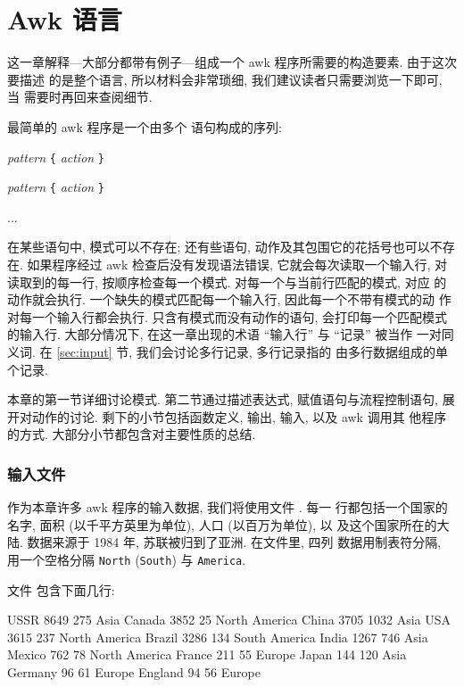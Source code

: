 
\chapter{Awk 语言}
\label{chap:the_awk_language}

这一章解释---大部分都带有例子---组成一个 awk 程序所需要的构造要素.
由于这次要描述
的是整个语言, 所以材料会非常琐细, 我们建议读者只需要浏览一下即可, 当
需要时再回来查阅细节.

最简单的 awk 程序是一个由多个 \patact 语句构成的序列:
\begin{pattern}
\textit{pattern} \texttt{\{} \textit{action} \texttt{\}} \par
\textit{pattern} \texttt{\{} \textit{action} \texttt{\}} \par
...
\end{pattern}
在某些语句中, 模式可以不存在; 还有些语句, 动作及其包围它的花括号也可以不存
在. 如果程序经过 awk 检查后没有发现语法错误, 它就会每次读取一个输入行,
对读取到的每一行, 按顺序检查每一个模式. 对每一个与当前行匹配的模式, 对应
的动作就会执行. 一个缺失的模式匹配每一个输入行, 因此每一个不带有模式的动
作对每一个输入行都会执行. 只含有模式而没有动作的语句, 会打印每一个匹配模式
的输入行. 大部分情况下, 在这一章出现的术语 ``输入行'' 与 ``记录'' 被当作
一对同义词. 在 \ref{sec:input} 节, 我们会讨论多行记录, 多行记录指的
由多行数据组成的单个记录.

本章的第一节详细讨论模式. 第二节通过描述表达式, 赋值语句与流程控制语句,
展开对动作的讨论. 剩下的小节包括函数定义, 输出, 输入, 以及 awk 调用其
他程序的方式. 大部分小节都包含对主要性质的总结.

\subsection*{输入文件}
\label{subsec:the_input_file_countries}

作为本章许多 awk 程序的输入数据, 我们将使用文件 . 每一
行都包括一个国家的名字, 面积 (以千平方英里为单位), 人口 (以百万为单位), 以
及这个国家所在的大陆. 数据来源于 1984 年, 苏联被归到了亚洲. 在文件里, 四列
数据用制表符分隔, 用一个空格分隔 \texttt{North} (\texttt{South}) 与
\texttt{America}.

文件  包含下面几行:
\begin{file}
    USSR        8649    275     Asia
    Canada      3852    25      North America
    China       3705    1032    Asia
    USA         3615    237     North America
    Brazil      3286    134     South America
    India       1267    746     Asia
    Mexico      762     78      North America
    France      211     55      Europe
    Japan       144     120     Asia
    Germany     96      61      Europe
    England     94      56      Europe
\end{file}

